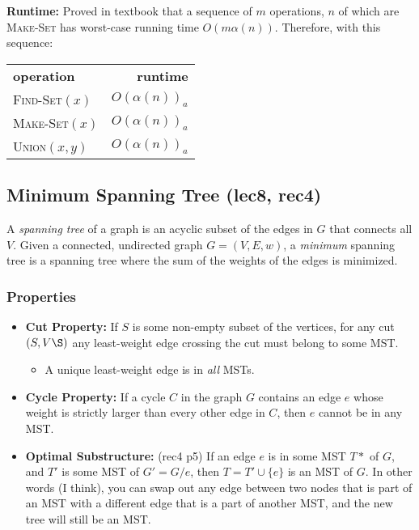 \documentclass{article}
\begin{document}
\begin{multicols}{2}
	\textbf{Runtime:} Proved in textbook that a sequence of $m$ operations, $n$ of which are \textsc{Make-Set} has worst-case running time $O(m\alpha(n))$. Therefore, with this sequence:
	\begin{center}
		\begin{tabular}{lr}
			\textbf{operation} & \textbf{runtime} \\
			\textsc{Find-Set}$(x)$ & $O(\alpha(n))_a$ \\
			\textsc{Make-Set}$(x)$ & $O(\alpha(n))_a$ \\
			\textsc{Union}$(x, y)$ & $O(\alpha(n))_a$ \\
		\end{tabular}
	\end{center}



	\subsection{Minimum Spanning Tree (lec8, rec4)}
	A \textit{spanning tree} of a graph is an acyclic subset of the edges in $G$ that connects all $V$. Given a connected, undirected graph $G=(V,E,w)$, a \textit{minimum} spanning tree is a spanning tree where the sum of the weights of the edges is minimized. 
	\subsubsection{Properties}
	\begin{itemize}[noitemsep, topsep=0pt]
		\item \textbf{Cut Property:} If $S$ is some non-empty subset of the vertices, for any cut $(S, V\S)$ any least-weight edge crossing the cut must belong to some MST.
			\begin{itemize}[noitemsep, topsep=0pt]
				\item A unique least-weight edge is in \textit{all} MSTs.
			\end{itemize}
		\item \textbf{Cycle Property:} If a cycle $C$ in the graph $G$ contains an edge $e$ whose weight is strictly larger than every other edge in $C$, then $e$ cannot be in any MST.
		\item \textbf{Optimal Substructure:} (rec4 p5) If an edge $e$ is in some MST $T*$ of $G$, and $T'$ is some MST of $G' = G/e$, then $T=T'\cup \{e\}$ is an MST of $G$. In other words (I think), you can swap out any edge between two nodes that is part of an MST with a different edge that is a part of another MST, and the new tree will still be an MST. 
	\end{itemize}

\end{multicols}
\end{document}
